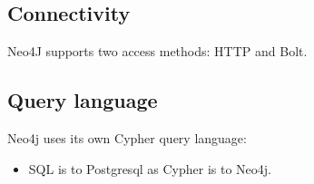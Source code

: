 \documentclass[slides]{pgnotes}
\begin{document}
\subsection{Connectivity}

Neo4J supports two access methods: HTTP and Bolt.

\subsection{Query language}

Neo4j uses its own Cypher query language:
\begin{itemize}
\item SQL is to Postgresql as Cypher is to Neo4j.
\end{itemize}
\end{document}
